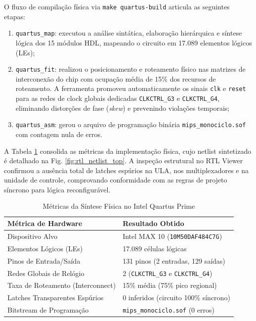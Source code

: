 O fluxo de compilação física via \texttt{make quartus-build} articula as seguintes etapas:
\begin{enumerate}\setlength{\itemsep}{1pt}\setlength{\parskip}{0pt}
    \item \texttt{quartus\_map}: executou a análise sintática, elaboração hierárquica e síntese lógica dos 15 módulos HDL, mapeando o circuito em 17.089 elementos lógicos (LEs);
    \item \texttt{quartus\_fit}: realizou o posicionamento e roteamento físico nas matrizes de interconexão do chip com ocupação média de 15\% dos recursos de roteamento. A ferramenta promoveu automaticamente os sinais \texttt{clk} e \texttt{reset} para as redes de clock globais dedicadas \texttt{CLKCTRL\_G3} e \texttt{CLKCTRL\_G4}, eliminando distorções de fase (\textit{skew}) e prevenindo violações temporais;
    \item \texttt{quartus\_asm}: gerou o arquivo de programação binária \texttt{mips\_monociclo.sof} com contagem nula de erros.
\end{enumerate}

A Tabela \ref{tab:quartus_resumo} consolida as métricas da implementação física, cujo netlist sintetizado é detalhado na Fig. \ref{fig:rtl_netlist_top}. A inspeção estrutural no RTL Viewer confirmou a ausência total de latches espúrios na ULA, nos multiplexadores e na unidade de controle, comprovando conformidade com as regras de projeto síncrono para lógica reconfigurável.

\begin{table}[htbp]
\centering
\caption{Métricas da Síntese Física no Intel Quartus Prime}
\label{tab:quartus_resumo}
\scriptsize
\setlength{\tabcolsep}{3pt}
\begin{tabular}{ll}
\toprule
\textbf{Métrica de Hardware} & \textbf{Resultado Obtido} \\
\midrule
Dispositivo Alvo & Intel MAX 10 (\texttt{10M50DAF484C7G}) \\
Elementos Lógicos (LEs) & 17.089 células lógicas \\
Pinos de Entrada/Saída & 131 pinos (2 entradas, 129 saídas) \\
Redes Globais de Relógio & 2 (\texttt{CLKCTRL\_G3} e \texttt{CLKCTRL\_G4}) \\
Taxa de Roteamento (Interconnect) & 15\% média (75\% pico regional) \\
Latches Transparentes Espúrios & 0 inferidos (circuito 100\% síncrono) \\
Bitstream de Programação & \texttt{mips\_monociclo.sof} (0 erros) \\
\bottomrule
\end{tabular}
\end{table}

